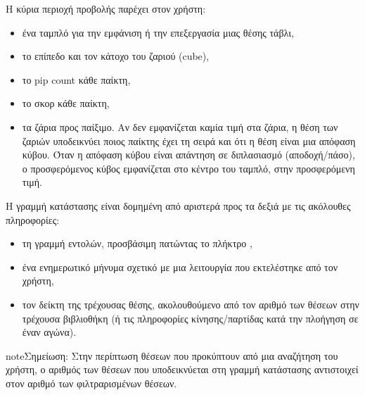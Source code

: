 \documentclass[letterpaper,10pt,greek]{sphinxmanual}
\begin{document}
\sphinxAtStartPar
Η κύρια περιοχή προβολής παρέχει στον χρήστη:
\begin{itemize}
\item {} 
\sphinxAtStartPar
ένα ταμπλό για την εμφάνιση ή την επεξεργασία μιας θέσης τάβλι,

\item {} 
\sphinxAtStartPar
το επίπεδο και τον κάτοχο του ζαριού (cube),

\item {} 
\sphinxAtStartPar
το pip count κάθε παίκτη,

\item {} 
\sphinxAtStartPar
το σκορ κάθε παίκτη,

\item {} 
\sphinxAtStartPar
τα ζάρια προς παίξιμο. Αν δεν εμφανίζεται καμία τιμή στα ζάρια, η θέση των ζαριών υποδεικνύει ποιος παίκτης έχει τη σειρά και ότι η θέση είναι μια απόφαση κύβου. Όταν η απόφαση κύβου είναι απάντηση σε διπλασιασμό (αποδοχή/πάσο), ο προσφερόμενος κύβος εμφανίζεται στο κέντρο του ταμπλό, στην προσφερόμενη τιμή.

\end{itemize}

\sphinxAtStartPar
Η γραμμή κατάστασης είναι δομημένη από αριστερά προς τα δεξιά με τις ακόλουθες πληροφορίες:
\begin{itemize}
\item {} 
\sphinxAtStartPar
τη γραμμή εντολών, προσβάσιμη πατώντας το πλήκτρο ,

\item {} 
\sphinxAtStartPar
ένα ενημερωτικό μήνυμα σχετικό με μια λειτουργία που εκτελέστηκε από τον χρήστη,

\item {} 
\sphinxAtStartPar
τον δείκτη της τρέχουσας θέσης, ακολουθούμενο από τον αριθμό των θέσεων στην τρέχουσα βιβλιοθήκη (ή τις πληροφορίες κίνησης/παρτίδας κατά την πλοήγηση σε έναν αγώνα).

\end{itemize}

\begin{sphinxadmonition}{note}{Σημείωση:}
\sphinxAtStartPar
Στην περίπτωση θέσεων που προκύπτουν από μια αναζήτηση του χρήστη, ο αριθμός των θέσεων που υποδεικνύεται στη γραμμή κατάστασης αντιστοιχεί στον αριθμό των φιλτραρισμένων θέσεων.
\end{sphinxadmonition}
\end{document}
